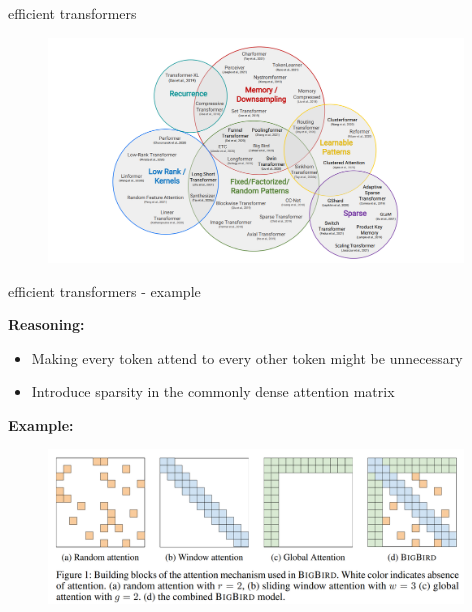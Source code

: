 \begin{frame}{efficient transformers}

\vfill

	\begin{figure}
		\centering
		\includegraphics[width = 11cm]{figure/tay-xformers.png}\\ 
	\end{figure}
	
\vfill

\end{frame}


\begin{frame}{efficient transformers - example}

\vfill

\textbf{Reasoning:} 

\begin{itemize}
	\item Making every token attend to every other token might be unnecessary
	\item Introduce sparsity in the commonly dense attention matrix
\end{itemize}

\textbf{Example:}

	\begin{figure}
		\centering
		\includegraphics[width = 11cm]{figure/bigbird-patterns.png}\\ 
	\end{figure}
	
\vfill

\end{frame}

